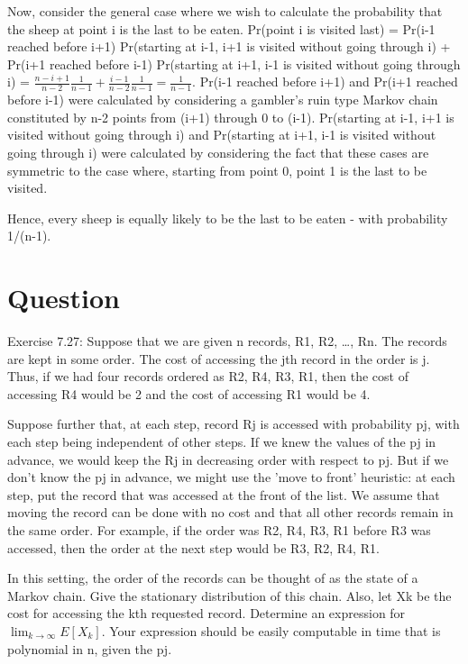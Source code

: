 \documentclass[10pt]{amsart}
\theoremstyle{remark}
\begin{document}
Now, consider the general case where we wish to calculate the probability that the sheep at point i is the last to be eaten. Pr(point i is visited last) = Pr(i-1 reached before i+1) Pr(starting at i-1, i+1 is visited without going through i) + Pr(i+1 reached before i-1) Pr(starting at i+1, i-1 is visited without going through i) = $\frac{n-i+1}{n-2}\frac{1}{n-1} + \frac{i-1}{n-2}\frac{1}{n-1} = \frac{1}{n-1}$. Pr(i-1 reached before i+1) and Pr(i+1 reached before i-1) were calculated by considering a gambler's ruin type Markov chain constituted by n-2 points from (i+1) through 0 to (i-1). Pr(starting at i-1, i+1 is visited without going through i) and Pr(starting at i+1, i-1 is visited without going through i) were calculated by considering the fact that these cases are symmetric to the case where, starting from point 0, point 1 is the last to be visited.

Hence, every sheep is equally likely to be the last to be eaten - with probability 1/(n-1).

\section{Question}
Exercise 7.27: Suppose that we are given n records, R1, R2, \dots, Rn. The records are kept in some order. The cost of accessing the jth record in the order is j. Thus, if we had four records ordered as R2, R4, R3, R1, then the cost of accessing R4 would be 2 and the cost of accessing R1 would be 4.

Suppose further that, at each step, record Rj is accessed with probability pj, with each step being independent of other steps. If we knew the values of the pj in advance, we would keep the Rj in decreasing order with respect to pj. But if we don't know the pj in advance, we might use the 'move to front' heuristic: at each step, put the record that was accessed at the front of the list. We assume that moving the record can be done with no cost and that all other records remain in the same order. For example, if the order was R2, R4, R3, R1 before R3 was accessed, then the order at the next step would be R3, R2, R4, R1.

In this setting, the order of the records can be thought of as the state of a Markov chain. Give the stationary distribution of this chain. Also, let Xk be the cost for accessing the kth requested record. Determine an expression for $\lim_{k \to \infty} E[X_{k}]$. Your expression should be easily computable in time that is polynomial in n, given the pj.
\end{document}
